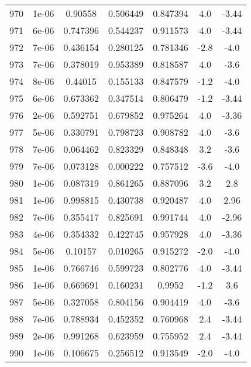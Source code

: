 \begin{table}
\begin{tabular}{c|c|c|c|c|c|c}
970 & 1e-06 & 0.90558 & 0.506449 & 0.847394 & 4.0 & -3.44\\
971 & 6e-06 & 0.747396 & 0.544237 & 0.911573 & 4.0 & -3.44\\
972 & 7e-06 & 0.436154 & 0.280125 & 0.781346 & -2.8 & -4.0\\
973 & 7e-06 & 0.378019 & 0.953389 & 0.818587 & 4.0 & -3.6\\
974 & 8e-06 & 0.44015 & 0.155133 & 0.847579 & -1.2 & -4.0\\
975 & 6e-06 & 0.673362 & 0.347514 & 0.806479 & -1.2 & -3.44\\
976 & 2e-06 & 0.592751 & 0.679852 & 0.975264 & 4.0 & -3.36\\
977 & 5e-06 & 0.330791 & 0.798723 & 0.908782 & 4.0 & -3.6\\
978 & 7e-06 & 0.064462 & 0.823329 & 0.848348 & 3.2 & -3.6\\
979 & 7e-06 & 0.073128 & 0.000222 & 0.757512 & -3.6 & -4.0\\
980 & 1e-06 & 0.087319 & 0.861265 & 0.887096 & 3.2 & 2.8\\
981 & 1e-06 & 0.998815 & 0.430738 & 0.920487 & 4.0 & 2.96\\
982 & 7e-06 & 0.355417 & 0.825691 & 0.991744 & 4.0 & -2.96\\
983 & 4e-06 & 0.354332 & 0.422745 & 0.957928 & 4.0 & -3.36\\
984 & 5e-06 & 0.10157 & 0.010265 & 0.915272 & -2.0 & -4.0\\
985 & 1e-06 & 0.766746 & 0.599723 & 0.802776 & 4.0 & -3.44\\
986 & 1e-06 & 0.669691 & 0.160231 & 0.9952 & -1.2 & 3.6\\
987 & 5e-06 & 0.327058 & 0.804156 & 0.904419 & 4.0 & -3.6\\
988 & 7e-06 & 0.788934 & 0.452352 & 0.760968 & 2.4 & -3.44\\
989 & 2e-06 & 0.991268 & 0.623959 & 0.755952 & 2.4 & -3.44\\
990 & 1e-06 & 0.106675 & 0.256512 & 0.913549 & -2.0 & -4.0\\
\end{tabular}
\end{table}
\newpage
